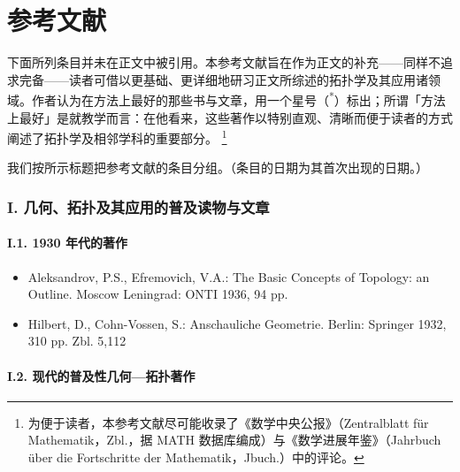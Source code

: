
\chapter*{参考文献}


\noindent 下面所列条目并未在正文中被引用。本参考文献旨在作为正文的补充——同样不追求完备——读者可借以更基础、更详细地研习正文所综述的拓扑学及其应用诸领域。作者认为在方法上最好的那些书与文章，用一个星号（\textsuperscript{*}）标出；所谓「方法上最好」是就教学而言：在他看来，这些著作以特别直观、清晰而便于读者的方式阐述了拓扑学及相邻学科的重要部分。
\footnote{为便于读者，本参考文献尽可能收录了《数学中央公报》（Zentralblatt für Mathematik，Zbl.，据 MATH 数据库编成）与《数学进展年鉴》（Jahrbuch über die Fortschritte der Mathematik，Jbuch.）中的评论。}

我们按所示标题把参考文献的条目分组。（条目的日期为其首次出现的日期。）

\subsection*{I. 几何、拓扑及其应用的普及读物与文章}

\subsubsection*{I.1. 1930 年代的著作}

\begin{itemize}
\item Aleksandrov, P.S., Efremovich, V.A.: The Basic Concepts of Topology: an Outline. Moscow Leningrad: ONTI 1936, 94 pp.
\item Hilbert, D., Cohn-Vossen, S.: Anschauliche Geometrie. Berlin: Springer 1932, 310 pp. Zbl. 5,112
\end{itemize}

\subsubsection*{I.2. 现代的普及性几何—拓扑著作}

